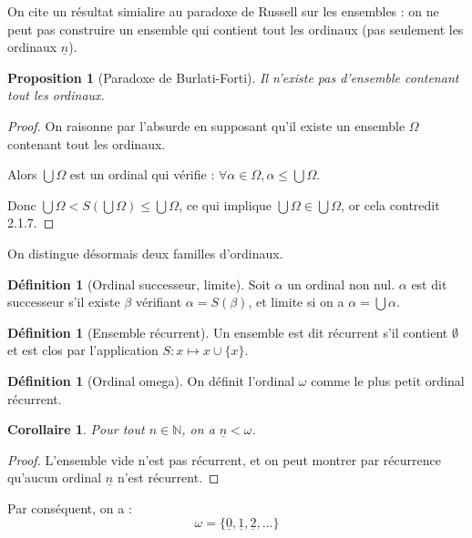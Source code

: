 \documentclass{article}
\theoremstyle{definition}
\newtheorem{definition}[subsubsection]{Définition}
\theoremstyle{plain}
\newtheorem{proposition}[subsubsection]{Proposition}
\theoremstyle{plain}
\newtheorem{corollary}[subsubsection]{Corollaire}
\theoremstyle{plain}
\theoremstyle{plain}
\theoremstyle{plain}
\begin{document}
\par On cite un résultat simialire au paradoxe de Russell sur les ensembles : on ne peut pas construire un ensemble qui contient tout les ordinaux (pas seulement les ordinaux \( \underline{n} \)).

\begin{proposition}[Paradoxe de Burlati-Forti]
	Il n'existe pas d'ensemble contenant tout les ordinaux.
\end{proposition}
\begin{proof}
	On raisonne par l'absurde en supposant qu'il existe un ensemble \( \Omega \) contenant tout les ordinaux.
	
	Alors \( \bigcup \Omega \) est un ordinal qui vérifie : \( \forall \alpha \in \Omega, \alpha \le \bigcup \Omega \). 

	Donc \( \bigcup\Omega < S(\bigcup\Omega) \le \bigcup\Omega \), ce qui implique \( \bigcup\Omega \in \bigcup\Omega \), or cela contredit 2.1.7.
\end{proof}
\par On distingue désormais deux familles d'ordinaux.
\begin{definition}[Ordinal successeur, limite]
	Soit \( \alpha \) un ordinal non nul. \( \alpha \) est dit successeur s'il existe \( \beta \) vérifiant \( \alpha = S(\beta) \), et limite si on a \( \alpha = \bigcup \alpha \).
\end{definition}

\begin{definition}[Ensemble récurrent]
	Un ensemble est dit récurrent s'il contient \( \emptyset \) et est clos par l'application \( S : x \mapsto x \cup \{x\} \).
\end{definition}
\begin{definition}[Ordinal omega]
	On définit l'ordinal \( \omega \) comme le plus petit ordinal récurrent.
\end{definition}

\begin{corollary}
	Pour tout \( n \in \mathbb{N} \), on a \( \underline{n} < \omega \).
\end{corollary}

\begin{proof}
	L'ensemble vide n'est pas récurrent, et on peut montrer par récurrence qu'aucun ordinal \( \underline{n} \) n'est récurrent.
\end{proof}

\par Par conséquent, on a :
\begin{equation*}
	\omega = \{\underline{0}, \underline{1}, \underline{2}, \ldots\}
\end{equation*}
\end{document}
